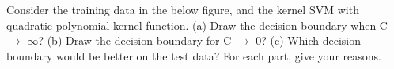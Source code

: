 Consider the training data in the below figure, and the kernel SVM with quadratic polynomial kernel function. (a) Draw the decision boundary when C \ensuremath{\to} \ensuremath{\infty}? (b) Draw the decision boundary for C \ensuremath{\to} 0? (c) Which decision boundary would be better on the test data? For each part, give your reasons.


